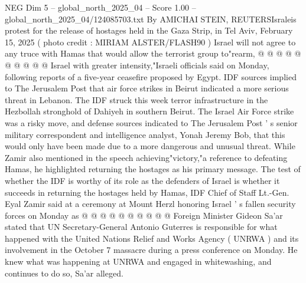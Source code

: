 \begin{textsample}{NEG Dim 5 – global\_north\_2025\_04 – Score 1.00 – global\_north\_2025\_04/124085703.txt}
By AMICHAI STEIN, REUTERSIsraleis protest for the release of hostages held in the Gaza Strip, in Tel Aviv, February 15, 2025 ( photo credit : MIRIAM ALSTER/FLASH90 ) Israel will not agree to any truce with Hamas that would allow the terrorist group to"rearm, @ @ @ @ @ @ @ @ @ @ Israel with greater intensity,"Israeli officials said on Monday, following reports of a five-year ceasefire proposed by Egypt.
IDF sources implied to The Jerusalem Post that air force strikes in Beirut indicated a more serious threat in Lebanon.
The IDF struck this week terror infrastructure in the Hezbollah stronghold of Dahiyeh in southern Beirut.
The Israel Air Force strike was a risky move, and defense sources indicated to The Jerusalem Post ' s senior military correspondent and intelligence analyst, Yonah Jeremy Bob, that this would only have been made due to a more dangerous and unusual threat.
While Zamir also mentioned in the speech achieving"victory,"a reference to defeating Hamas, he highlighted returning the hostages as his primary message.
The test of whether the IDF is worthy of its role as the defenders of Israel is whether it succeeds in returning the hostages held by Hamas, IDF Chief of Staff Lt.-Gen.
Eyal Zamir said at a ceremony at Mount Herzl honoring Israel ' s fallen security forces on Monday as @ @ @ @ @ @ @ @ @ @ Foreign Minister Gideon Sa'ar stated that UN Secretary-General Antonio Guterres is responsible for what happened with the United Nations Relief and Works Agency ( UNRWA ) and its involvement in the October 7 massacre during a press conference on Monday.
He knew what was happening at UNRWA and engaged in whitewashing, and continues to do so, Sa'ar alleged.

\end{textsample}
